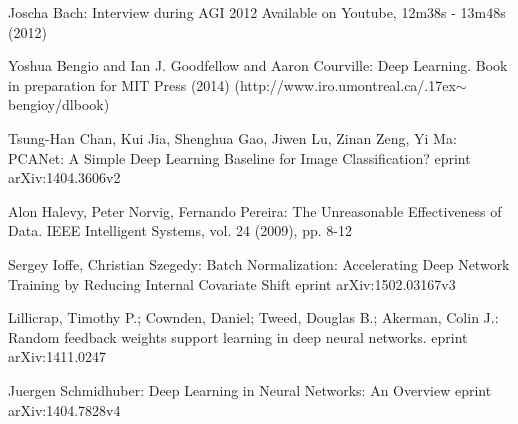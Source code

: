 \documentclass[citeauthoryear]{llncs}
\begin{document}
%
%
\begin{thebibliography}{}
%
\newcommand{\mytilde}{\raise.17ex\hbox{$\scriptstyle\mathtt{\sim}$}}

Joscha Bach:
Interview during AGI 2012
Available on Youtube, 12m38s - 13m48s (2012)

Yoshua Bengio and Ian J. Goodfellow and Aaron Courville:
Deep Learning.
Book in preparation for MIT Press (2014)
(http://www.iro.umontreal.ca/\mytilde{}bengioy/dlbook)

Tsung-Han Chan, Kui Jia, Shenghua Gao, Jiwen Lu, Zinan Zeng, Yi Ma:
PCANet: A Simple Deep Learning Baseline for Image Classification?
eprint arXiv:1404.3606v2

Alon Halevy, Peter Norvig, Fernando Pereira:
The Unreasonable Effectiveness of Data.
IEEE Intelligent Systems, vol. 24 (2009), pp. 8-12

Sergey Ioffe, Christian Szegedy:
Batch Normalization: Accelerating Deep Network Training by Reducing Internal Covariate Shift
eprint  arXiv:1502.03167v3

Lillicrap, Timothy P.; Cownden, Daniel; Tweed, Douglas B.; Akerman, Colin J.:
Random feedback weights support learning in deep neural networks.
eprint arXiv:1411.0247

Juergen Schmidhuber:
Deep Learning in Neural Networks: An Overview
eprint arXiv:1404.7828v4

%
%
%
%

\end{thebibliography}
\end{document}
